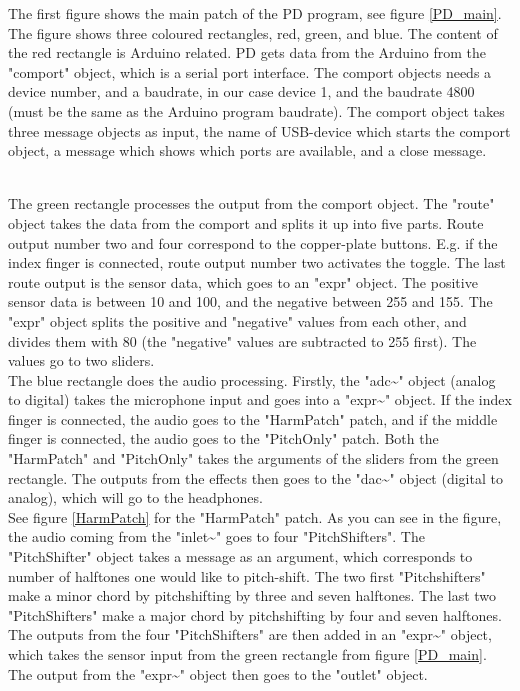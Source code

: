 The first figure shows the main patch of the PD program, see figure \ref{PD_main}. The figure shows three coloured rectangles, red, green, and blue. 
The content of the red rectangle is Arduino related. PD gets data from the Arduino from the "comport" object, which is a serial port interface. 
The comport objects needs a device number, and a baudrate, in our case device 1, and the baudrate 4800 (must be the same as the Arduino program baudrate). The comport object takes three message objects as input, the name of USB-device which starts the comport object, a message which shows which ports are available, and a close message.   \\

\begin{minipage}{\linewidth}%
\label{PD_main}
\end{minipage}\\

The green rectangle processes the output from the comport object. The "route" object takes the data from the comport and splits it up into five parts. 
Route output number two and four correspond to the copper-plate buttons. E.g. if the index finger is connected, route output number two activates the toggle. 
The last route output is the sensor data, which goes to an "expr" object. The positive sensor data is between 10 and 100, and the negative between 255 and 155. 
The "expr" object splits the positive and "negative" values from each other, and divides them with 80 (the "negative" values are subtracted to 255 first). 
The values go to two sliders.\\

The blue rectangle does the audio processing. Firstly, the "adc\textasciitilde" object (analog to digital) takes the microphone input and goes into a "expr\textasciitilde" object. If the index finger is connected, 
the audio goes to the "HarmPatch" patch, and if the middle finger is connected, the audio goes to the "PitchOnly" patch. Both the "HarmPatch" and "PitchOnly" takes 
the arguments of the sliders from the green rectangle. The outputs from the effects then goes to the "dac\textasciitilde" object (digital to analog), which will go to the headphones.\\

See figure \ref{HarmPatch} for the "HarmPatch" patch. As you can see in the figure, the audio coming from the "inlet\textasciitilde" goes to four "PitchShifters". The "PitchShifter" object
takes a message as an argument, which corresponds to number of halftones one would like to pitch-shift. The two first "Pitchshifters" make a minor chord by pitchshifting by three and seven halftones.  The last two "PitchShifters" make a major chord by pitchshifting by four and seven halftones. The outputs from the four "PitchShifters" are then added in an "expr\textasciitilde" object, which takes the
sensor input from the green rectangle from figure \ref{PD_main}. The output from the "expr\textasciitilde" object then goes to the "outlet" object.
 
